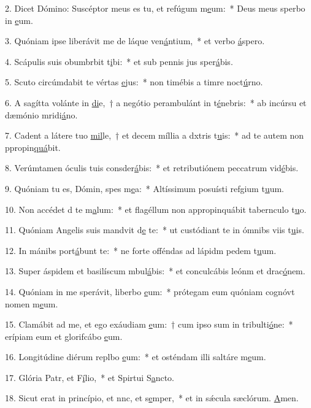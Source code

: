 2. Dicet Dómino: Suscéptor meus es tu, et refúgum m\uline{e}um:~* Deus meus sperbo in \uline{e}um.\par 
3. Quóniam ipse liberávit me de láque ven\uline{á}ntium,~* et  verbo \uline{á}spero.\par 
4. Scápulis suis obumbrbit t\uline{i}bi:~* et sub pennis jus sper\uline{á}bis.\par 
5. Scuto circúmdabit te vértas \uline{e}jus:~* non timébis a timre noct\uline{ú}rno.\par 
6. A sagítta volánte in \uline{di}e,~† a negótio perambulánt in t\uline{é}nebris:~* ab incúrsu et dæmónio mridi\uline{á}no.\par 
7. Cadent a látere tuo \uline{mil}le,~† et decem míllia a dxtris t\uline{u}is:~* ad te autem non ppropin\uline{quá}bit.\par 
8. Verúmtamen óculis tuis consder\uline{á}bis:~* et retributiónem peccatrum vid\uline{é}bis.\par 
9. Quóniam tu es, Dómin, spes m\uline{e}a:~* Altíssimum posuísti refgium t\uline{u}um.\par 
10. Non accédet d te m\uline{a}lum:~* et flagéllum non appropinquábit tabernculo t\uline{u}o.\par 
11. Quóniam Angelis suis mandvit d\uline{e} te:~* ut custódiant te in ómnibs viis t\uline{u}is.\par 
12. In mánibs port\uline{á}bunt te:~* ne forte offéndas ad lápidm pedem t\uline{u}um.\par 
13. Super áspidem et basilíscum mbul\uline{á}bis:~* et conculcábis leónm et drac\uline{ó}nem.\par 
14. Quóniam in me sperávit, liberbo \uline{e}um:~* prótegam eum quóniam cognóvt nomen m\uline{e}um.\par 
15. Clamábit ad me, et ego exáudiam \uline{e}um:~† cum ipso sum in tribulti\uline{ó}ne:~* erípiam eum et glorifcábo \uline{e}um.\par 
16. Longitúdine diérum replbo \uline{e}um:~* et osténdam illi saltáre m\uline{e}um.\par 
17. Glória Patr, et F\uline{í}lio,~* et Spirtui S\uline{a}ncto.\par 
18. Sicut erat in princípio, et nnc, et s\uline{e}mper,~* et in sǽcula sæclórum. \uline{A}men.\par 
